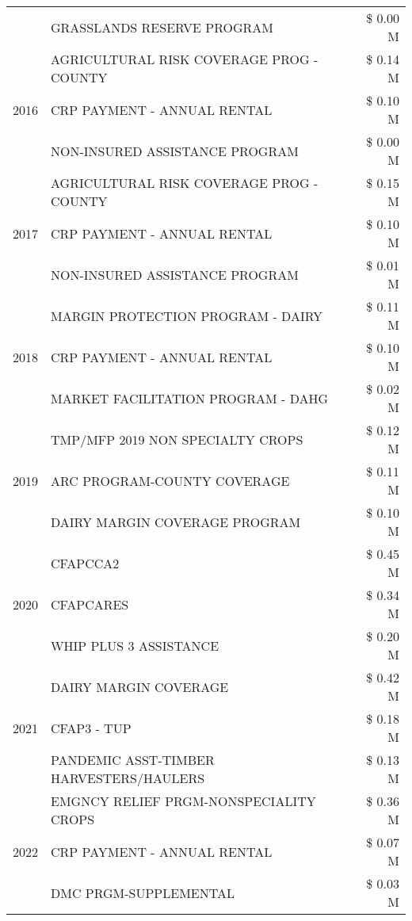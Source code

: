 \begin{tabular}{llr}
 & GRASSLANDS RESERVE PROGRAM & \$ 0.00 M \\
\cline{1-3}
\multirow[t]{3}{*}{2016} & AGRICULTURAL RISK COVERAGE PROG - COUNTY & \$ 0.14 M \\
 & CRP PAYMENT - ANNUAL RENTAL & \$ 0.10 M \\
 & NON-INSURED ASSISTANCE PROGRAM & \$ 0.00 M \\
\cline{1-3}
\multirow[t]{3}{*}{2017} & AGRICULTURAL RISK COVERAGE PROG - COUNTY & \$ 0.15 M \\
 & CRP PAYMENT - ANNUAL RENTAL & \$ 0.10 M \\
 & NON-INSURED ASSISTANCE PROGRAM & \$ 0.01 M \\
\cline{1-3}
\multirow[t]{3}{*}{2018} & MARGIN PROTECTION PROGRAM - DAIRY & \$ 0.11 M \\
 & CRP PAYMENT - ANNUAL RENTAL & \$ 0.10 M \\
 & MARKET FACILITATION PROGRAM - DAHG & \$ 0.02 M \\
\cline{1-3}
\multirow[t]{3}{*}{2019} & TMP/MFP 2019 NON SPECIALTY CROPS & \$ 0.12 M \\
 & ARC PROGRAM-COUNTY COVERAGE & \$ 0.11 M \\
 & DAIRY MARGIN COVERAGE PROGRAM & \$ 0.10 M \\
\cline{1-3}
\multirow[t]{3}{*}{2020} & CFAPCCA2 & \$ 0.45 M \\
 & CFAPCARES & \$ 0.34 M \\
 & WHIP PLUS 3 ASSISTANCE & \$ 0.20 M \\
\cline{1-3}
\multirow[t]{3}{*}{2021} & DAIRY MARGIN COVERAGE & \$ 0.42 M \\
 & CFAP3 - TUP & \$ 0.18 M \\
 & PANDEMIC ASST-TIMBER HARVESTERS/HAULERS & \$ 0.13 M \\
\cline{1-3}
\multirow[t]{3}{*}{2022} & EMGNCY RELIEF PRGM-NONSPECIALITY CROPS & \$ 0.36 M \\
 & CRP PAYMENT - ANNUAL RENTAL & \$ 0.07 M \\
 & DMC PRGM-SUPPLEMENTAL & \$ 0.03 M \\
\cline{1-3}
\bottomrule
\end{tabular}
